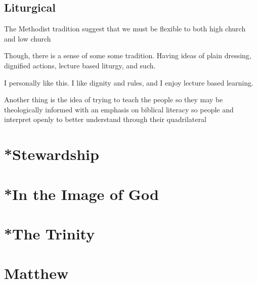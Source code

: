 \subsection{Liturgical}
\par The Methodist tradition suggest that we must be flexible to both high church and low church
\par Though, there is a sense of some some tradition. Having ideas of plain dressing, dignified actions, lecture based liturgy, and such.
\par I personally like this. I like dignity and rules, and I enjoy lecture based learning.
\par Another thing is the idea of trying to teach the people so they may be theologically informed with an emphasis on biblical literacy so people and interpret openly to better understand through their quadrilateral

\section{*Stewardship}
\section{*In the Image of God}
\section{*The Trinity}

\section{Matthew}
